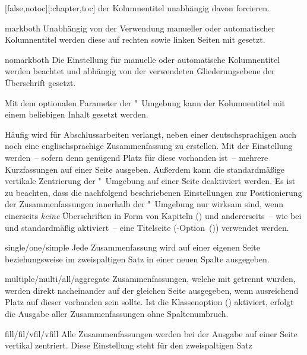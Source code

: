 \begin{Declaration*}{}
\begin{Declaration*}{}
\begin{Declaration*}{}
\begin{Declaration}[%
  v2.02!\Option{abstract=multiple}:ersetzt \Option{abstract=double}'none';%
  v2.02!\Option{abstract=tocleveldown};%
  v2.02!\Option{abstract=markboth};%
  v2.04!\Option{abstract=tocmultiple}%
]{}[false,notoc][:chapter,toc]
der Kolumnentitel unabhängig davon forcieren.
%
\begin{values}{}
\item[markboth]
  Unabhängig von der Verwendung manueller oder automatischer Kolumnentitel 
  werden diese auf rechten sowie linken Seiten mit  gesetzt.
\item[nomarkboth]
  Die Einstellung für manuelle oder automatische Kolumnentitel werden beachtet 
  und abhängig von der verwendeten Gliederungsebene der Überschrift gesetzt.
\end{values}
%
Mit dem optionalen Parameter  der 
"~Umgebung kann der Kolumnentitel mit einem beliebigen 
Inhalt gesetzt werden.

Häufig wird für Abschlussarbeiten verlangt, neben einer deutschsprachigen auch 
noch eine englischsprachige Zusammenfassung zu erstellen. Mit der Einstellung 
 werden~-- sofern denn genügend Platz für diese 
vorhanden ist~-- mehrere Kurzfassungen auf einer Seite ausgeben. Außerdem kann 
die standardmäßige vertikale Zentrierung der "~Umgebung 
auf einer Seite deaktiviert werden. Es ist zu beachten, dass die nachfolgend 
beschriebenen Einstellungen zur Positionierung der Zusammenfassungen innerhalb 
der "~Umgebung nur wirksam sind, wenn einerseits 
\emph{keine} Überschriften in Form von Kapiteln ()
und andererseits~-- wie bei  und  
standardmäßig aktiviert~-- eine Titelseite 
(\KOMAScript-Option~()) verwendet 
werden.
%
\begin{values}{}
\item[single/one/simple]
  Jede Zusammenfassung wird auf einer eigenen Seite
  beziehungsweise im zweispaltigen Satz in einer neuen Spalte ausgegeben.
\item[multiple/multi/all/aggregate]
  Zusammenfassungen, welche mit  getrennt wurden, werden 
  direkt nacheinander auf der gleichen Seite ausgegeben, wenn ausreichend Platz 
  auf dieser vorhanden sein sollte. Ist die Klassenoption 
  () aktiviert, erfolgt die Ausgabe aller 
  Zusammenfassungen ohne Spaltenumbruch.
\item[fill/fil/vfil/vfill]
  Alle Zusammenfassungen werden bei der Ausgabe auf einer Seite vertikal 
  zentriert. Diese Einstellung steht für den zweispaltigen Satz

\end{values}
\end{Declaration}
\end{Declaration*}
\end{Declaration*}
\end{Declaration*}
